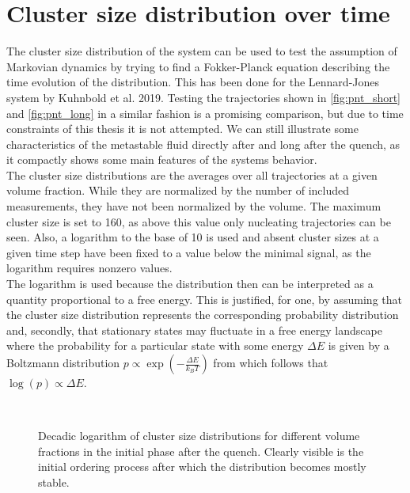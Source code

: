 \section{Cluster size distribution over time}
\label{sec:pnt}
The cluster size distribution of the system can be used to test the assumption of Markovian dynamics by trying to find a Fokker-Planck equation describing the time evolution of the distribution. This has been done for the Lennard-Jones system by Kuhnbold et al. 2019\cite{Kuhnbold2019}. Testing the trajectories shown in \autoref{fig:pnt_short} and \autoref{fig:pnt_long} in a similar fashion is a promising comparison, but due to time constraints of this thesis it is not attempted. We can still illustrate some characteristics of the metastable fluid directly after and long after the quench, as it compactly shows some main features of the systems behavior.\\ 

The cluster size distributions are the averages over all trajectories at a given volume fraction. While they are normalized by the number of included measurements, they have not been normalized by the volume. The maximum cluster size is set to 160, as above this value only nucleating trajectories can be seen. Also, a logarithm to the base of 10 is used and absent cluster sizes at a given time step have been fixed to a value below the minimal signal, as the logarithm requires nonzero values.\\

The logarithm is used because the distribution then can be interpreted as a quantity proportional to a free energy. This is justified, for one, by assuming that the cluster size distribution represents the corresponding probability distribution and, secondly, that stationary states may fluctuate in a free energy landscape where the probability for a particular state with some energy $\Delta E$ is given by a Boltzmann distribution $p\propto \exp \left( - \frac{\Delta E}{k_B T} \right)$ from which follows that $\log(p) \propto \Delta E$.\\

\begin{figure}[h]
\begin{center}
 \hspace{0.0cm}
\\
 \hspace{0.0cm}
\caption[Cluster size distributions over time shortly after the quench]{Decadic logarithm of cluster size distributions for different volume fractions in the initial phase after the quench. Clearly visible is the initial ordering process after which the distribution becomes mostly stable.}
\label{fig:pnt_short}
\end{center}
\end{figure}

